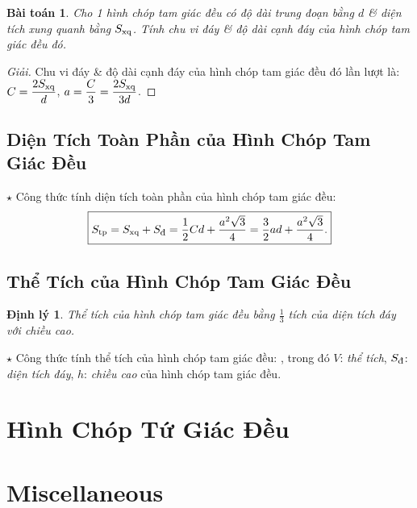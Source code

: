 \documentclass{article}
\newtheorem{baitoan}{Bài toán}
\newtheorem{dinhly}{Định lý}
\begin{document}
\begin{baitoan}
	Cho 1 hình chóp tam giác đều có độ dài trung đoạn bằng $d$ \& diện tích xung quanh bằng $S_{\rm xq}$. Tính chu vi đáy \& độ dài cạnh đáy của hình chóp tam giác đều đó.
\end{baitoan}

\begin{proof}[Giải]
	Chu vi đáy \& độ dài cạnh đáy của hình chóp tam giác đều đó lần lượt là: $C = \dfrac{2S_{\rm xq}}{d}$, $a = \dfrac{C}{3} = \dfrac{2S_{\rm xq}}{3d}$.
\end{proof}

\subsection{Diện Tích Toàn Phần của Hình Chóp Tam Giác Đều}
\noindent$\star$ {\sf Công thức tính diện tích toàn phần của hình chóp tam giác đều:}
\begin{align*}
	\boxed{S_{\rm tp} = S_{\rm xq} + S_{\footnotesize\mbox{\rm đ}} = \frac{1}{2}Cd + \frac{a^2\sqrt{3}}{4} = \frac{3}{2}ad + \frac{a^2\sqrt{3}}{4}.}
\end{align*}

\subsection{Thể Tích của Hình Chóp Tam Giác Đều}

\begin{dinhly}
	Thể tích của hình chóp tam giác đều bằng $\frac{1}{3}$ tích của diện tích đáy với chiều cao.
\end{dinhly}
\noindent$\star$ {\sf Công thức tính thể tích của hình chóp tam giác đều:} , trong đó $V$: \textit{thể tích}, $S_{\footnotesize\mbox{\rm đ}}$: \textit{diện tích đáy}, $h$: \textit{chiều cao} của hình chóp tam giác đều.


\section{Hình Chóp Tứ Giác Đều}


\section{Miscellaneous}


\printbibliography[heading=bibintoc]
	
\end{document}
